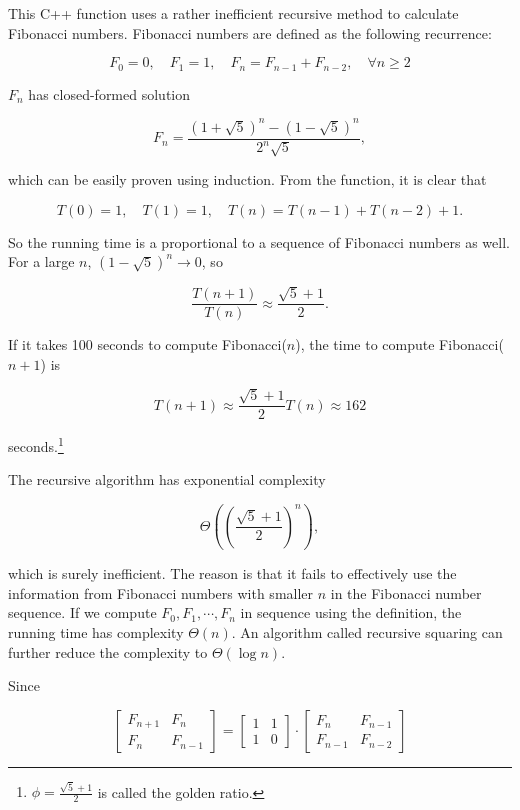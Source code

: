 \begin{solution}
This C++ function uses a rather inefficient recursive method to calculate Fibonacci numbers.
Fibonacci numbers are defined as the following recurrence:

\[
F_0=0,\quad F_1=1,\quad F_n=F_{n-1}+F_{n-2},\quad\forall n\geq 2
\]

$F_n$ has closed-formed solution

\[
F_n=\frac{(1+\sqrt{5})^n-(1-\sqrt{5})^n}{2^n\sqrt{5}},
\]

which can be easily proven using induction. From the function, it is clear that

\[
T(0)=1,\quad T(1)=1,\quad T(n)=T(n-1)+T(n-2)+1.
\]

So the running time is a proportional to a sequence of Fibonacci numbers as well. For a
large $n$, $(1-\sqrt{5})^n\to0$, so

\[
\frac{T(n+1)}{T(n)}\approx\frac{\sqrt{5}+1}{2}.
\]

If it takes 100 seconds to compute Fibonacci($n$), the time to compute Fibonacci($n+1$) is

\[
T(n+1)\approx\frac{\sqrt{5}+1}{2}T(n)\approx 162
\]

seconds.\footnote[7]{$\phi=\frac{\sqrt{5}+1}{2}$ is called the golden ratio.}


The recursive algorithm has exponential complexity

\[
\Theta\left(\left(\frac{\sqrt{5}+1}{2}\right)^n\right),
\]

which is surely inefficient. The reason is that it fails to effectively use the information
from Fibonacci numbers with smaller $n$ in the Fibonacci number sequence. If we compute
$F_0,F_1,\cdots,F_n$ in sequence using the definition, the running time has complexity
$\Theta(n)$. An algorithm called recursive squaring can further reduce the complexity to
$\Theta(\log n)$.

Since

\[
\begin{bmatrix}
F_{n+1} & F_n\\
F_n & F_{n-1}
\end{bmatrix}
=\begin{bmatrix}
1 & 1\\
1 & 0
\end{bmatrix}\cdot
\begin{bmatrix}
F_n & F_{n-1}\\
F_{n-1} & F_{n-2}
\end{bmatrix}
\]


\end{solution}
